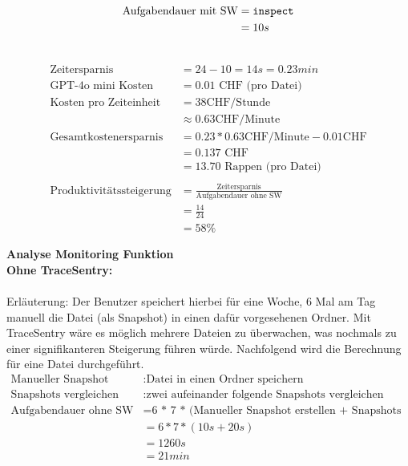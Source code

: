 \documentclass[a4paper,12pt]{report}
\begin{document}
     \\
    \begin{align*}
        \text{Aufgabendauer mit SW} &= \text{\texttt{inspect}} \\
        &= 10s
    \end{align*}

     \\
    \begin{align*}
        \text{Zeitersparnis} &= 24 - 10 = 14s = 0.23min \\
        \text{GPT-4o mini Kosten} &= 0.01 \text{ CHF (pro Datei)} \\
        \text{Kosten pro Zeiteinheit} &= 38 \text{CHF/Stunde} \\ &\approx 0.63 \text{CHF/Minute} \\
        \text{Gesamtkostenersparnis} &= 0.23 * 0.63 \text{CHF/Minute} - 0.01 \text{CHF} \\ &= 0.137 \text{ CHF} \\ &= 13.70 \text{ Rappen (pro Datei)} \\
        \\
        \text{Produktivitätssteigerung} &= \frac{\text{Zeitersparnis}}{\text{Aufgabendauer ohne SW}}
        \\ &= \frac{\text{14}}{\text{24}}
        \\ &= 58\%
    \end{align*}

    \newpage

    \textbf{Analyse Monitoring Funktion} \\

    \textbf{Ohne TraceSentry:} \\
    \\

    Erläuterung: Der Benutzer speichert hierbei für eine Woche, 6 Mal am Tag manuell die Datei (als Snapshot) in einen dafür vorgesehenen Ordner.
    Mit TraceSentry wäre es möglich mehrere Dateien zu überwachen, was nochmals zu einer signifikanteren Steigerung führen würde.
    Nachfolgend wird die Berechnung für eine Datei durchgeführt.
    \begin{align*}
        \text{Manueller Snapshot erstellen}&: \text{Datei in einen Ordner speichern}\\
        \text{Snapshots vergleichen}&: \text{zwei aufeinander folgende Snapshots vergleichen} \\
        \text{Aufgabendauer ohne SW} &= \text{6 * 7 * (Manueller Snapshot erstellen + Snapshots vergleichen)} \\
        &= 6 * 7 * (10s + 20s) \\
        &= 1260s \\
        &= 21min \\
    \end{align*}
\end{document}
